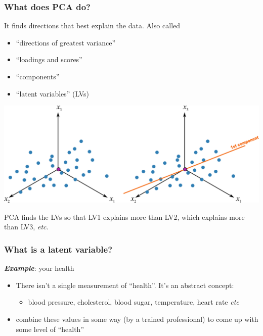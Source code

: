 \begin{frame}\frametitle{What does PCA do?}

	It finds directions that best explain the data.  Also called
	
	\begin{itemize}
		\item  	``directions of greatest variance''
		\item	``loadings and scores''
		\item	``components''
		\item	``latent variables'' (LVs)
	\end{itemize}

	\begin{center}
		\includegraphics[width=\textwidth]{images/geometric-PCA-3-and-4-centered-with-first-component.png}
	\end{center}
	
	PCA finds the LVs so that LV1 explains more than LV2, which explains more than LV3, \emph{etc}.
\end{frame}

\begin{frame}\frametitle{What is a latent variable?}

	\textbf{\emph{Example}}: your health
	
	\begin{itemize}
		\item	There isn't a single measurement of ``health''.  It's an abstract concept: 
		
				\begin{itemize}
					\item	blood pressure, cholesterol, blood sugar, temperature, heart rate \emph{etc}
				\end{itemize}				
				
		\item	combine these values in some way (by a trained professional) to come up with some level of ``health''
	\end{itemize}
	
	\pause
	
	{\color{myGreen}{We can do this with any system!}}
\end{frame}

